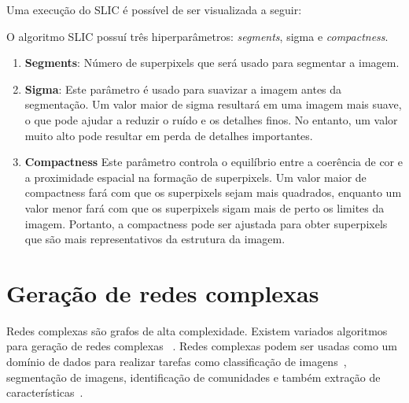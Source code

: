 Uma execução do SLIC é possível de ser visualizada a seguir:

\begin{figure}[h!]
        \captionsetup{width=12cm}
		\centering
\end{figure}

O algoritmo \gls{SLIC} possuí três hiperparâmetros: \textit{segments}, sigma e \textit{compactness}.

\begin{enumerate}
\item \textbf{Segments}: Número de superpixels que será usado para
  segmentar a imagem.
\item \textbf{Sigma}: Este parâmetro é usado para suavizar a imagem antes da
segmentação. Um valor maior de sigma resultará em uma imagem mais
suave, o que pode ajudar a reduzir o ruído e os detalhes finos. No
entanto, um valor muito alto pode resultar em perda de detalhes
importantes.
\item \textbf{Compactness} Este parâmetro controla o equilíbrio entre a coerência
de cor e a proximidade espacial na formação de superpixels. Um valor
maior de compactness fará com que os superpixels sejam mais
quadrados, enquanto um valor menor fará com que os superpixels
sigam mais de perto os limites da imagem. Portanto, a compactness pode
ser ajustada para obter superpixels que são mais representativos da
estrutura da imagem.
\end{enumerate}


\section{Geração de redes complexas}\label{sec:teorica-redes-complexas}

Redes complexas são grafos de alta complexidade. Existem variados
algoritmos para geração de redes complexas
~\cite{ComplexNetworksSurvey2007}. Redes complexas podem ser usadas
como um domínio de dados para realizar tarefas como classificação de
imagens~\cite{ComplexNetworksImageClassification2015}, segmentação de
imagens, identificação de comunidades e também extração de
características~\cite{JarbasComplexNetworks2020}.

